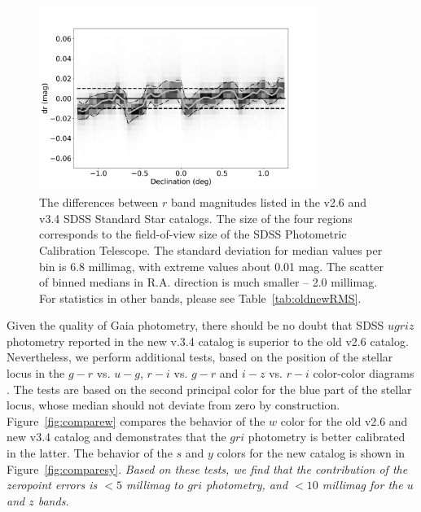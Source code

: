 \begin{figure}[th!]
    \centering\includegraphics[width=9cm]{figures/testV26vsV33_r_dr_Dec_Hess.png} 
\caption{The differences between $r$ band magnitudes listed in the v2.6 and v3.4 
    SDSS Standard Star catalogs. The size of the four regions corresponds to the
field-of-view size of the SDSS Photometric Calibration Telescope. The standard 
deviation for median values per bin is 6.8 millimag, with extreme values about 0.01 mag. 
The scatter of binned medians in R.A. direction is much smaller -- 2.0 millimag. 
For statistics in other bands, please see Table~\ref{tab:oldnewRMS}.}
\label{fig:v26v34drDec}
\end{figure}
 


Given the quality of Gaia photometry, there should be no doubt that SDSS $ugriz$ photometry
reported in the new v.3.4 catalog is superior to the old v2.6 catalog. Nevertheless, we perform
additional tests, based on the position of the stellar locus in the $g-r$ vs. $u-g$, $r-i$ vs. $g-r$ 
and $i-z$ vs. $r-i$ color-color diagrams  \citep{2004AN....325..583I}. The tests are based
on the second principal color for the blue part of the stellar locus, whose median should 
not deviate from zero by construction. Figure~\ref{fig:comparew} compares the behavior
of the $w$ color for the old v2.6 and new v3.4 catalog and demonstrates that the $gri$
photometry is better calibrated in the latter. The behavior of the $s$ and $y$ colors for the 
new catalog is shown in Figure~\ref{fig:comparesy}. {\it Based on these tests, we find that 
the contribution of the zeropoint errors is $<5$ millimag to $gri$ photometry, and 
$<10$ millimag for the $u$ and $z$ bands.} 



